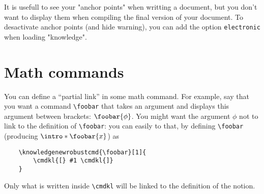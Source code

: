 \documentclass[a4]{article}
\begin{document}
It is usefull to see your "anchor points" when writting a document, but you don't want to display them when compiling the final version of your document. To desactivate anchor points (and hide warning), you can add the option
\texttt{electronic} when loading "knowledge".


\section{Math commands}

You can define a ``partial link'' in some math command.
For example, say that you want a command \texttt{\textbackslash foobar} that takes an argument and displays this
argument between brackets: $\foobar{\phi}$.
You might want the argument $\phi$ not to link to the definition of \texttt{\textbackslash foobar}: you can easily
to that, by defining \AP \texttt{\textbackslash foobar} (producing $\intro*\foobar{x}$) as 
\begin{verbatim}
    \knowledgenewrobustcmd{\foobar}[1]{
        \cmdkl{[} #1 \cmdkl{]}
    }
\end{verbatim}
Only what is written inside \texttt{\textbackslash cmdkl} will be linked to the definition of the notion. 
\end{document}
